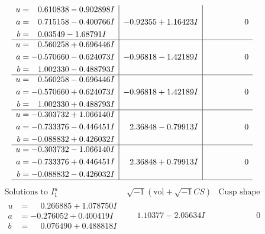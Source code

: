 \documentclass[1p]{elsarticle_modified}
\theoremstyle{definition}
\newcommand{\I}{\sqrt{-1}}
\begin{document}
$$\begin{array}{c|c|c}
\begin{aligned}
u &= \phantom{-}0.610838 - 0.902898 I \\
a &= \phantom{-}0.715158 - 0.400766 I \\
b &= \phantom{-}0.03549 - 1.68791 I\end{aligned}
 & -0.92355 + 1.16423 I & \phantom{-0.000000 } 0 \\ \hline\begin{aligned}
u &= \phantom{-}0.560258 + 0.696446 I \\
a &= -0.570660 - 0.624073 I \\
b &= \phantom{-}1.002330 - 0.488793 I\end{aligned}
 & -0.96818 - 1.42189 I & \phantom{-0.000000 } 0 \\ \hline\begin{aligned}
u &= \phantom{-}0.560258 - 0.696446 I \\
a &= -0.570660 + 0.624073 I \\
b &= \phantom{-}1.002330 + 0.488793 I\end{aligned}
 & -0.96818 + 1.42189 I & \phantom{-0.000000 } 0 \\ \hline\begin{aligned}
u &= -0.303732 + 1.066140 I \\
a &= -0.733376 - 0.446451 I \\
b &= -0.088832 + 0.426032 I\end{aligned}
 & \phantom{-}2.36848 - 0.79913 I & \phantom{-0.000000 } 0 \\ \hline\begin{aligned}
u &= -0.303732 - 1.066140 I \\
a &= -0.733376 + 0.446451 I \\
b &= -0.088832 - 0.426032 I\end{aligned}
 & \phantom{-}2.36848 + 0.79913 I & \phantom{-0.000000 } 0\\
 \hline 
 \end{array}$$\newpage$$\begin{array}{c|c|c}  
\text{Solutions to }I^u_{1}& \I (\text{vol} + \sqrt{-1}CS) & \text{Cusp shape}\\
 \hline 
\begin{aligned}
u &= \phantom{-}0.266885 + 1.078750 I \\
a &= -0.276052 + 0.400419 I \\
b &= \phantom{-}0.076490 + 0.488818 I\end{aligned}
 & \phantom{-}1.10377 - 2.05634 I & \phantom{-0.000000 } 0 \\ \hline\begin{aligned}

\end{aligned}
\end{array}$$
\end{document}
